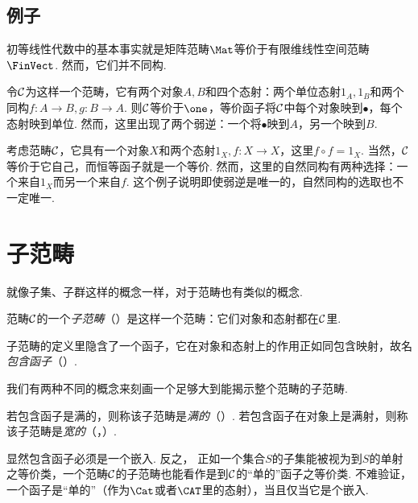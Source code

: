 \subsection{例子}
\begin{exam}
  初等线性代数中的基本事实就是矩阵范畴$\Mat$等价于有限维线性空间范畴$\FinVect$. 然而，它们并不同构.
\end{exam}
\begin{exam}
  令${\cal C}$为这样一个范畴，它有两个对象$A,B$和四个态射：两个单位态射$1_A, 1_B$和两个同构$f\colon A\to B, g\colon B\to A$.
  则${\cal C}$等价于$\one$，等价函子将${\cal C}$中每个对象映到$\bullet$，每个态射映到单位.
  然而，这里出现了两个弱逆：一个将$\bullet$映到$A$，另一个映到$B$.
\end{exam}
\begin{exam}
  考虑范畴${\cal C}$，它具有一个对象$X$和两个态射$1_X, f\colon X\to X$，这里$f \circ f = 1_X$.
  当然，${\cal C}$等价于它自己，而恒等函子就是一个等价. 然而，这里的自然同构有两种选择：一个来自$1_X$而另一个来自$f$. 这个例子说明即使弱逆是唯一的，自然同构的选取也不一定唯一.
\end{exam}

\section{子范畴}
  就像子集、子群这样的概念一样，对于范畴也有类似的概念.
  \begin{defn}
    范畴${\cal C}$的一个\emph{子范畴}（）是这样一个范畴：它们对象和态射都在${\cal C}$里.
  \end{defn}
    子范畴的定义里隐含了一个函子，它在对象和态射上的作用正如同包含映射，故名\emph{包含函子}（）.

  我们有两种不同的概念来刻画一个足够大到能揭示整个范畴的子范畴.
  \begin{defn}
    若包含函子是满的，则称该子范畴是\emph{满的}（）.
    若包含函子在对象上是满射，则称该子范畴是\emph{宽的}（，）.
  \end{defn}

  显然包含函子必须是一个嵌入.
  反之，
  正如一个集合$S$的子集能被视为到$S$的单射之等价类，一个范畴${\cal C}$的子范畴也能看作是到${\cal C}$的``单的''函子之等价类.
  不难验证，一个函子是``单的''（作为$\Cat$或者$\CAT$里的态射），当且仅当它是个嵌入.

